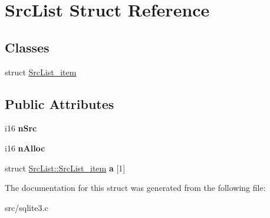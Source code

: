 \hypertarget{struct_src_list}{\section{Src\-List Struct Reference}
\label{struct_src_list}
}
\subsection*{Classes}
\begin{DoxyCompactItemize}
\item 
struct \hyperlink{struct_src_list_1_1_src_list__item}{Src\-List\-\_\-item}
\end{DoxyCompactItemize}
\subsection*{Public Attributes}
\begin{DoxyCompactItemize}
\item 
\hypertarget{struct_src_list_a99c1d923c49fc0598d92f1cb54958ef4}{i16 {\bfseries n\-Src}}\label{struct_src_list_a99c1d923c49fc0598d92f1cb54958ef4}

\item 
\hypertarget{struct_src_list_aae88b994b131fea8c733aa609bae7e6e}{i16 {\bfseries n\-Alloc}}\label{struct_src_list_aae88b994b131fea8c733aa609bae7e6e}

\item 
\hypertarget{struct_src_list_acd181938f7144b40022b28072247aa3d}{struct \hyperlink{struct_src_list_1_1_src_list__item}{Src\-List\-::\-Src\-List\-\_\-item} {\bfseries a} \mbox{[}1\mbox{]}}\label{struct_src_list_acd181938f7144b40022b28072247aa3d}

\end{DoxyCompactItemize}


The documentation for this struct was generated from the following file\-:\begin{DoxyCompactItemize}
\item 
src/sqlite3.\-c\end{DoxyCompactItemize}
